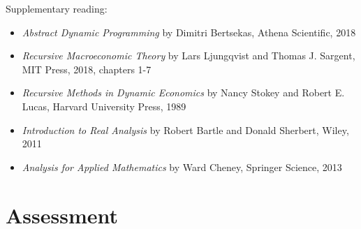 \begin{frame}

    Supplementary reading:
    
    \begin{itemize}
        \item \emph{Abstract Dynamic Programming} by Dimitri Bertsekas, Athena
        Scientific, 2018
            \vspace{0.3em}
            \vspace{0.3em}
        \item \emph{Recursive Macroeconomic Theory} by Lars Ljungqvist and Thomas J. Sargent, MIT Press, 2018, chapters 1-7
            \vspace{0.3em}
            \vspace{0.3em}
        \item \emph{Recursive Methods in Dynamic Economics} by Nancy Stokey and Robert E. Lucas, Harvard University Press, 1989
            \vspace{0.3em}
            \vspace{0.3em}
        \item \emph{Introduction to Real Analysis} by Robert Bartle and Donald
            Sherbert, Wiley, 2011
            \vspace{0.3em}
            \vspace{0.3em}
        \item \emph{Analysis for Applied Mathematics} by Ward Cheney, Springer Science, 2013 
            \vspace{0.3em}
    \end{itemize}

\end{frame}




\section{Assessment}

